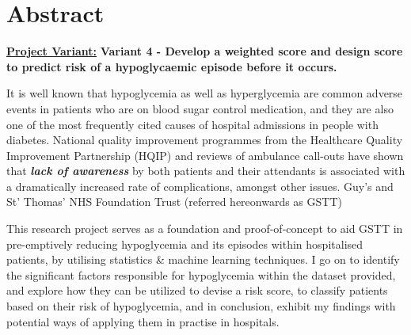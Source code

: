 
\section*{Abstract}


    \textbf{\underline{Project Variant:}} \textbf{ Variant 4 - Develop a weighted score and design score to predict risk of a hypoglycaemic episode before it occurs.} 

    \vspace{10pt}
    \par{It is well known that hypoglycemia as well as hyperglycemia are common adverse events in patients who are on blood sugar control medication, and they are also one of the most frequently cited causes of hospital admissions in people with diabetes. National quality improvement programmes from the Healthcare Quality Improvement Partnership (HQIP) and reviews of ambulance call-outs have shown that \textbf{\textit{lack of awareness}} by both patients and their attendants is associated with a dramatically increased rate of complications, amongst other issues. Guy's and St' Thomas' NHS Foundation Trust (referred hereonwards as GSTT) }

    \vspace{10pt}
    \par{This research project serves as a foundation and proof-of-concept to aid GSTT in pre-emptively reducing hypoglycemia and its episodes within hospitalised patients, by utilising statistics \& machine learning techniques. I go on to identify the significant factors responsible for hypoglycemia within the dataset provided, and explore how they can be utilized to devise a risk score, to classify patients based on their risk of hypoglycemia, and in conclusion, exhibit my findings with potential ways of applying them in practise in hospitals.}

    \vspace{10pt}

    \par{}


